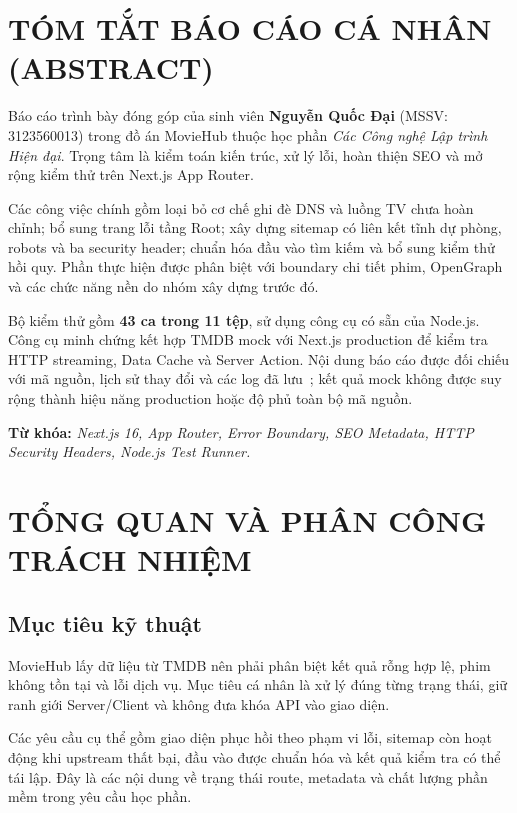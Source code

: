 \documentclass[12pt,a4paper]{extarticle}
\begin{document}
\newpage
{}
\setcounter{page}{2}

\section*{TÓM TẮT BÁO CÁO CÁ NHÂN (ABSTRACT)}
Báo cáo trình bày đóng góp của sinh viên \textbf{Nguyễn Quốc Đại} (MSSV: 3123560013) trong đồ án MovieHub thuộc học phần \textit{Các Công nghệ Lập trình Hiện đại}. Trọng tâm là kiểm toán kiến trúc, xử lý lỗi, hoàn thiện SEO và mở rộng kiểm thử trên Next.js App Router.

Các công việc chính gồm loại bỏ cơ chế ghi đè DNS và luồng TV chưa hoàn chỉnh; bổ sung trang lỗi tầng Root; xây dựng sitemap có liên kết tĩnh dự phòng, robots và ba security header; chuẩn hóa đầu vào tìm kiếm và bổ sung kiểm thử hồi quy. Phần thực hiện được phân biệt với boundary chi tiết phim, OpenGraph và các chức năng nền do nhóm xây dựng trước đó.

Bộ kiểm thử gồm \textbf{43 ca trong 11 tệp}, sử dụng công cụ có sẵn của Node.js. Công cụ minh chứng kết hợp TMDB mock với Next.js production để kiểm tra HTTP streaming, Data Cache và Server Action. Nội dung báo cáo được đối chiếu với mã nguồn, lịch sử thay đổi và các log đã lưu~\cite{moviehub-source,moviehub-evidence}; kết quả mock không được suy rộng thành hiệu năng production hoặc độ phủ toàn bộ mã nguồn.

\vspace{0.3cm}
\noindent \textbf{Từ khóa:} \textit{Next.js 16, App Router, Error Boundary, SEO Metadata, HTTP Security Headers, Node.js Test Runner.}

\clearpage
\section{TỔNG QUAN VÀ PHÂN CÔNG TRÁCH NHIỆM}
\subsection{Mục tiêu kỹ thuật}
MovieHub lấy dữ liệu từ TMDB nên phải phân biệt kết quả rỗng hợp lệ, phim không tồn tại và lỗi dịch vụ. Mục tiêu cá nhân là xử lý đúng từng trạng thái, giữ ranh giới Server/Client và không đưa khóa API vào giao diện.

Các yêu cầu cụ thể gồm giao diện phục hồi theo phạm vi lỗi, sitemap còn hoạt động khi upstream thất bại, đầu vào được chuẩn hóa và kết quả kiểm tra có thể tái lập. Đây là các nội dung về trạng thái route, metadata và chất lượng phần mềm trong yêu cầu học phần.
\end{document}
